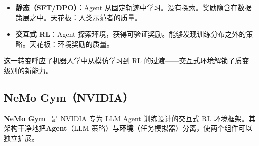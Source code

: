 \begin{keybox}[静态 vs.\ 交互式训练]
\begin{itemize}
  \item \textbf{静态（SFT/DPO）}：Agent 从固定轨迹中学习。没有探索。奖励隐含在数据策展之中。天花板：人类示范者的质量。
  \item \textbf{交互式 RL}：Agent 探索环境，获得可验证奖励。能够发现训练分布之外的策略。天花板：环境奖励的质量。
\end{itemize}
这一转变呼应了机器人学中从模仿学习到 RL 的过渡——交互式环境解锁了质变级别的新能力。
\end{keybox}

\subsection{NeMo Gym（NVIDIA）}
\label{subsec:nemo-gym}

\textbf{NeMo Gym}~\cite{nemogym2025nvidia} 是 NVIDIA 专为 LLM Agent 训练设计的交互式 RL 环境框架。其架构干净地把\textbf{Agent}（LLM 策略）与\textbf{环境}（任务模拟器）分离，使两个组件可以独立扩展。

